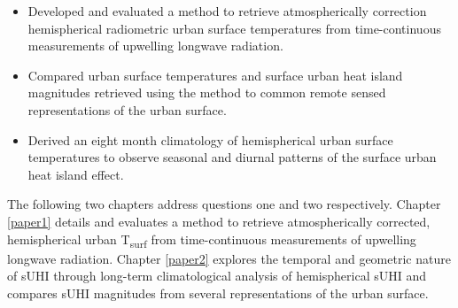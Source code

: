 \begin{bibunit}
\begin{itemize}
	\item Developed and evaluated a method to retrieve atmospherically correction hemispherical radiometric urban surface temperatures from time-continuous measurements of upwelling longwave radiation.
	\item Compared urban surface temperatures and surface urban heat island magnitudes retrieved using the method to common remote sensed representations of the urban surface.
	\item Derived an eight month climatology of hemispherical urban surface temperatures to observe seasonal and diurnal patterns of the surface urban heat island effect.
\end{itemize}

The following two chapters address questions one and two respectively. Chapter \ref{paper1} details and evaluates a method to retrieve atmospherically corrected, hemispherical urban T\textsubscript{surf} from time-continuous measurements of upwelling longwave radiation. Chapter \ref{paper2} explores the temporal and geometric nature of sUHI through long-term climatological analysis of hemispherical sUHI and compares sUHI magnitudes from several representations of the urban surface.


\cleardoublepage 
{}  
\renewcommand*{\bibname}{References}

\putbib
\end{bibunit}